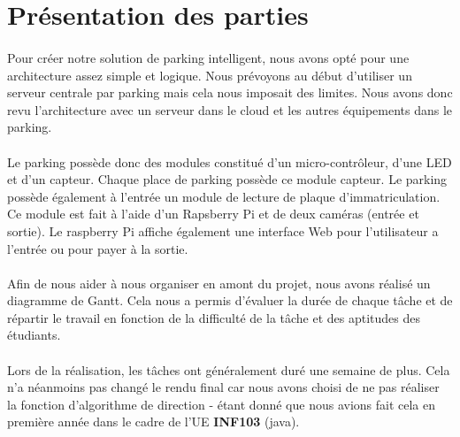\section{Présentation des parties}


\paragraph*{}
Pour créer notre solution de parking intelligent, nous avons opté pour une architecture assez simple et logique. Nous prévoyons au début d'utiliser un serveur centrale par parking mais cela nous imposait des limites. Nous avons donc revu l'architecture avec un serveur dans le cloud et les autres équipements dans le parking.

\paragraph*{}
Le parking possède donc des modules constitué d'un micro-contrôleur, d'une LED et d'un capteur. Chaque place de parking possède ce module capteur.
Le parking possède également à l'entrée un module de lecture de plaque d'immatriculation. Ce module est fait à l'aide d'un Rapsberry Pi et de deux caméras (entrée et sortie). Le raspberry Pi affiche également une interface Web pour l'utilisateur a l'entrée ou pour payer à la sortie.


\clearpage

\paragraph*{}
Afin de nous aider à nous organiser en amont du projet, nous avons réalisé un diagramme de Gantt. Cela nous a permis d'évaluer la durée de chaque tâche et de répartir le travail en fonction de la difficulté de la tâche et des aptitudes des étudiants.


\paragraph*{}
Lors de la réalisation, les tâches ont généralement duré une semaine de plus. Cela n'a néanmoins pas changé le rendu final car nous avons choisi de ne pas réaliser la fonction d'algorithme de direction - étant donné que nous avions fait cela en première année dans le cadre de l'UE \textbf{INF103} (java).

